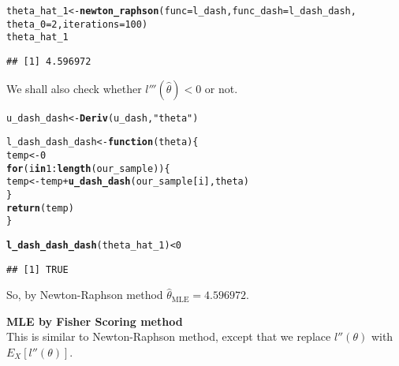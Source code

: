 \documentclass[11pt, a4paper]{article}\usepackage[]{graphicx}\usepackage[]{xcolor}
\makeatletter
\newcommand{\hlnum}[1]{\textcolor[rgb]{0.686,0.059,0.569}{#1}}%
\newcommand{\hlsng}[1]{\textcolor[rgb]{0.192,0.494,0.8}{#1}}%
\newcommand{\hlopt}[1]{\textcolor[rgb]{0,0,0}{#1}}%
\newcommand{\hldef}[1]{\textcolor[rgb]{0.345,0.345,0.345}{#1}}%
\newcommand{\hlkwa}[1]{\textcolor[rgb]{0.161,0.373,0.58}{\textbf{#1}}}%
\newcommand{\hlkwb}[1]{\textcolor[rgb]{0.69,0.353,0.396}{#1}}%
\newcommand{\hlkwc}[1]{\textcolor[rgb]{0.333,0.667,0.333}{#1}}%
\newcommand{\hlkwd}[1]{\textcolor[rgb]{0.737,0.353,0.396}{\textbf{#1}}}%
\newenvironment{kframe}{%
 \def\at@end@of@kframe{}%
 \ifinner\ifhmode%
  \def\at@end@of@kframe{\end{minipage}}%
  \begin{minipage}{\columnwidth}%
 \fi\fi%
 \def\FrameCommand##1{\hskip\@totalleftmargin \hskip-\fboxsep
 \colorbox{shadecolor}{##1}\hskip-\fboxsep
     \hskip-\linewidth \hskip-\@totalleftmargin \hskip\columnwidth}%
 \MakeFramed {\advance\hsize-\width
   \@totalleftmargin\z@ \linewidth\hsize
   \@setminipage}}%
 {\par\unskip\endMakeFramed%
 \at@end@of@kframe}
\newenvironment{knitrout}{}{} %
\makeatother
\begin{document}
\begin{knitrout}
\color{fgcolor}\begin{kframe}
\begin{alltt}
\hldef{theta_hat_1} \hlkwb{<-} \hlkwd{newton_raphson}\hldef{(}\hlkwc{func} \hldef{= l_dash,} \hlkwc{func_dash} \hldef{= l_dash_dash,}
                              \hlkwc{theta_0} \hldef{=} \hlnum{2}\hldef{,} \hlkwc{iterations} \hldef{=} \hlnum{100}\hldef{)}
\hldef{theta_hat_1}
\end{alltt}
\begin{verbatim}
## [1] 4.596972
\end{verbatim}
\end{kframe}
\end{knitrout}

We shall also check whether $l'''(\hat{\theta}) < 0$ or not.

\begin{knitrout}
\color{fgcolor}\begin{kframe}
\begin{alltt}
\hldef{u_dash_dash} \hlkwb{<-} \hlkwd{Deriv}\hldef{(u_dash,} \hlsng{"theta"}\hldef{)}

\hldef{l_dash_dash_dash} \hlkwb{<-} \hlkwa{function}\hldef{(}\hlkwc{theta}\hldef{)\{}
  \hldef{temp} \hlkwb{<-} \hlnum{0}
  \hlkwa{for} \hldef{(i} \hlkwa{in} \hlnum{1}\hlopt{:}\hlkwd{length}\hldef{(our_sample)) \{}
    \hldef{temp} \hlkwb{<-} \hldef{temp} \hlopt{+} \hlkwd{u_dash_dash}\hldef{(our_sample[i], theta)}
  \hldef{\}}
  \hlkwd{return}\hldef{(temp)}
\hldef{\}}

\hlkwd{l_dash_dash_dash}\hldef{(theta_hat_1)} \hlopt{<} \hlnum{0}
\end{alltt}
\begin{verbatim}
## [1] TRUE
\end{verbatim}
\end{kframe}
\end{knitrout}

So, by Newton-Raphson method $\hat{\theta}_{\text{MLE}} = 4.596972$. \\

\vspace{0.5cm}

\faArrowAltCircleRight[regular] \hspace{0.5cm} \textbf{MLE by Fisher Scoring method} \\

This is similar to Newton-Raphson method, except that we replace $l''(\theta)$ with $E_X[l''(\theta)]$. \\
\end{document}
